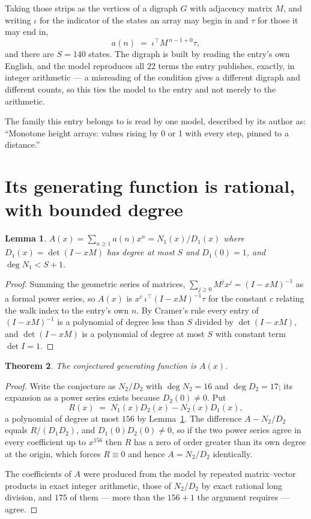 \documentclass[11pt,a4paper]{article}
\theoremstyle{plain}
\newtheorem{theorem}{Theorem}
\newtheorem{lemma}[theorem]{Lemma}
\theoremstyle{definition}
\begin{document}
Taking those strips as the vertices of a digraph $G$ with adjacency matrix $M$, and writing
$\iota$ for the indicator of the states an array may begin in and $\tau$ for those it may end
in,
\[
a(n)\;=\;\iota^{\!\top}M^{\,n-1+0}\tau ,
\]
and there are $S=140$ states. The digraph is built by reading the entry's own English, and the
model reproduces all $22$ terms the entry publishes, exactly, in integer arithmetic --- a
misreading of the condition gives a different digraph and different counts, so this ties the
model to the entry and not merely to the arithmetic.

The family this entry belongs to is read by one model, described by its author as: ``Monotone height arrays: values rising by 0 or 1 with every step, pinned to a distance.''


\section{Its generating function is rational, with bounded degree}

\begin{lemma}\label{lem:rat}
$A(x)=\sum_{n\ge1}a(n)x^n=N_1(x)/D_1(x)$ where $D_1(x)=\det(I-xM)$ has degree at most
$S$ and $D_1(0)=1$, and $\deg N_1<S+1$.
\end{lemma}

\begin{proof}
Summing the geometric series of matrices, $\sum_{j\ge0}M^jx^j=(I-xM)^{-1}$ as a formal
power series, so $A(x)$ is $x^{c}\,\iota^{\!\top}(I-xM)^{-1}\tau$ for the constant $c$
relating the walk index to the entry's own $n$. By Cramer's rule every entry of
$(I-xM)^{-1}$ is a polynomial of degree less than $S$ divided by $\det(I-xM)$, and
$\det(I-xM)$ is a polynomial of degree at most $S$ with constant term $\det I=1$.
\end{proof}

\begin{theorem}
The conjectured generating function is $A(x)$.
\end{theorem}

\begin{proof}
Write the conjecture as $N_2/D_2$ with $\deg N_2=16$ and $\deg D_2=17$; its expansion as a
power series exists because $D_2(0)\neq0$. Put
\[
R(x)\;=\;N_1(x)D_2(x)-N_2(x)D_1(x),
\]
a polynomial of degree at most $156$ by Lemma~\ref{lem:rat}. The difference
$A-N_2/D_2$ equals $R/(D_1D_2)$, and $D_1(0)D_2(0)\neq0$, so if the two power series agree in
every coefficient up to $x^{156}$ then $R$ has a zero of order greater than its own
degree at the origin, which forces $R\equiv0$ and hence $A=N_2/D_2$ identically.

The coefficients of $A$ were produced from the model by repeated matrix--vector products in
exact integer arithmetic, those of $N_2/D_2$ by exact rational long division, and $175$
of them --- more than the $156+1$ the argument requires --- agree.
\end{proof}
\end{document}
